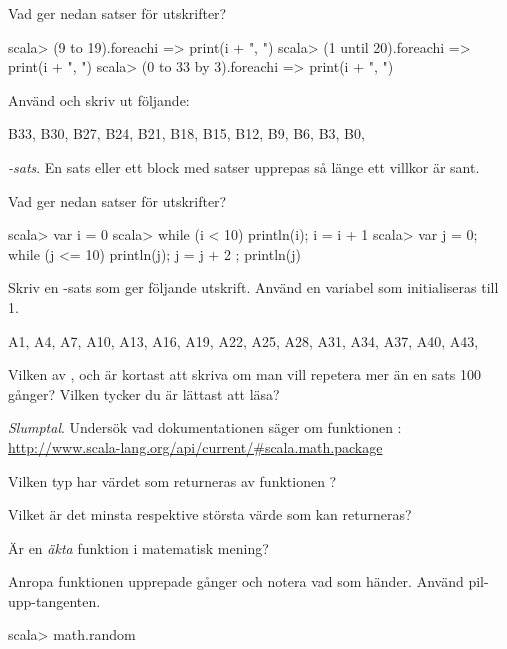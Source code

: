 {{\Subtask Vad ger nedan satser för utskrifter?

\begin{REPL}
scala> (9 to 19).foreach{i => print(i + ", ")}
scala> (1 until 20).foreach{i => print(i + ", ")}
scala> (0 to 33 by 3).foreach{i => print(i + ", ")}
\end{REPL}

\Subtask Använd  och skriv ut följande:
\begin{REPLnonum}
B33, B30, B27, B24, B21, B18, B15, B12, B9, B6, B3, B0,
\end{REPLnonum}

\Task {}\textit{-sats}. En sats eller ett block med satser upprepas så länge ett villkor är sant.  %

\Subtask Vad ger nedan satser för utskrifter?
\begin{REPL}
scala> var i = 0
scala> while (i < 10) { println(i); i = i + 1 }
scala> var j = 0; while (j <= 10) { println(j); j = j + 2 }; println(j)
\end{REPL}

\Subtask Skriv en -sats som ger följande utskrift. Använd en variabel  som initialiseras till 1.
\begin{REPLnonum}
A1, A4, A7, A10, A13, A16, A19, A22, A25, A28, A31, A34, A37, A40, A43,
\end{REPLnonum}

\Subtask\Pen Vilken av ,  och  är kortast att skriva om man vill repetera mer än en sats 100 gånger? Vilken tycker du är lättast att läsa?

\Task \textit{Slumptal}. Undersök vad dokumentationen säger om funktionen :\\  %
\url{http://www.scala-lang.org/api/current/#scala.math.package}

\Subtask\Pen Vilken typ har värdet som returneras av funktionen ?

\Subtask\Pen Vilket är det minsta respektive största värde som kan returneras?

\Subtask\Pen Är  en \textit{äkta} funktion  i matematisk mening?

\Subtask Anropa funktionen  upprepade gånger och notera vad som händer. Använd pil-upp-tangenten.
\begin{REPLnonum}
scala> math.random
\end{REPLnonum}


}}
